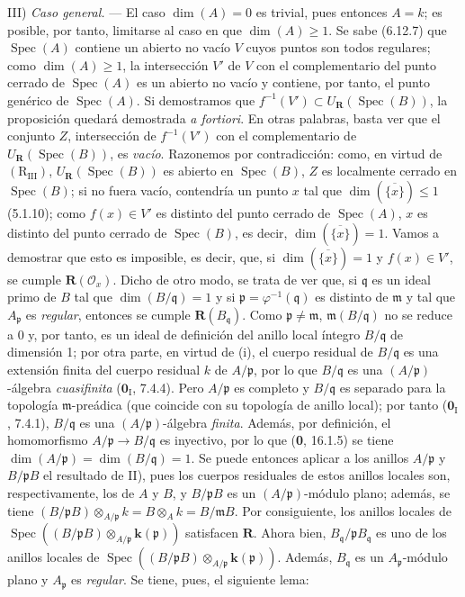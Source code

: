III) \emph{Caso general.} --- El caso $\dim(A)=0$ es trivial, pues entonces
$A=k$; es posible, por tanto, limitarse al caso en que $\dim(A)\geqslant1$.
Se sabe (6.12.7) que $\operatorname{Spec}(A)$ contiene un abierto no vacío
$V$ cuyos puntos son todos regulares; como $\dim(A)\geqslant1$, la
intersección $V'$ de $V$ con el complementario del punto cerrado de
$\operatorname{Spec}(A)$ es un abierto no vacío y contiene, por tanto, el
punto genérico de $\operatorname{Spec}(A)$. Si demostramos que
$f^{-1}(V')\subset U_{\mathbf R}(\operatorname{Spec}(B))$,
la proposición quedará demostrada \emph{a fortiori}. En otras palabras,
basta ver que el conjunto $Z$, intersección de $f^{-1}(V')$ con el
complementario de $U_{\mathbf R}(\operatorname{Spec}(B))$, es \emph{vacío}.
Razonemos por contradicción: como, en virtud de
$(\mathrm R_{\mathrm{III}})$,
$U_{\mathbf R}(\operatorname{Spec}(B))$ es abierto en
$\operatorname{Spec}(B)$, $Z$ es localmente cerrado en
$\operatorname{Spec}(B)$; si no fuera vacío, contendría un punto $x$ tal
que $\dim(\overline{\{x\}})\leqslant1$ (5.1.10); como $f(x)\in V'$
es distinto del punto cerrado de $\operatorname{Spec}(A)$, $x$ es distinto
del punto cerrado de $\operatorname{Spec}(B)$, es decir,
$\dim(\overline{\{x\}})=1$. Vamos a demostrar que esto es imposible,
es decir, que, si $\dim(\overline{\{x\}})=1$ y $f(x)\in V'$, se cumple
$\boldsymbol R(\mathscr O_x)$. Dicho de otro modo, se trata de ver que,
si $\mathfrak q$ es un ideal primo de $B$ tal que
$\dim(B/\mathfrak q)=1$ y si $\mathfrak p=\varphi^{-1}(\mathfrak q)$
es distinto de $\mathfrak m$ y tal que $A_{\mathfrak p}$ es \emph{regular},
entonces se cumple $\boldsymbol R(B_{\mathfrak q})$. Como
$\mathfrak p\ne\mathfrak m$, $\mathfrak m(B/\mathfrak q)$ no se reduce
a 0 y, por tanto, es un ideal de definición del anillo local íntegro
$B/\mathfrak q$ de dimensión 1; por otra parte, en virtud de (i), el
cuerpo residual de $B/\mathfrak q$ es una extensión finita del cuerpo
residual $k$ de $A/\mathfrak p$, por lo que $B/\mathfrak q$ es una
$(A/\mathfrak p)$-álgebra \emph{cuasifinita} ($\mathbf{0}_{\mathrm I}$, 7.4.4). Pero
$A/\mathfrak p$ es completo y $B/\mathfrak q$ es separado para la
topología $\mathfrak m$-preádica (que coincide con su topología de anillo
local); por tanto ($\mathbf{0}_{\mathrm I}$, 7.4.1), $B/\mathfrak q$ es una
$(A/\mathfrak p)$-álgebra \emph{finita}. Además, por definición, el homomorfismo
$A/\mathfrak p\to B/\mathfrak q$ es inyectivo, por lo que (\textbf{0}, 16.1.5)
se tiene
$\dim(A/\mathfrak p)=\dim(B/\mathfrak q)=1$.
Se puede entonces aplicar a los anillos $A/\mathfrak p$ y
$B/\mathfrak pB$ el resultado de II), pues los cuerpos residuales de
estos anillos locales son, respectivamente, los de $A$ y $B$, y
$B/\mathfrak pB$ es un $(A/\mathfrak p)$-módulo plano; además, se tiene
$(B/\mathfrak pB)\otimes_{A/\mathfrak p}k=B\otimes_A k=B/\mathfrak mB$.
Por consiguiente, los anillos locales de
$\operatorname{Spec}((B/\mathfrak pB)
\otimes_{A/\mathfrak p}\boldsymbol{k}(\mathfrak p))$
satisfacen $\boldsymbol R$. Ahora bien,
$B_{\mathfrak q}/\mathfrak pB_{\mathfrak q}$ es uno de los anillos
locales de $\operatorname{Spec}((B/\mathfrak pB)
\otimes_{A/\mathfrak p}\boldsymbol{k}(\mathfrak p))$. Además, $B_{\mathfrak q}$ es
un $A_{\mathfrak p}$-módulo plano y $A_{\mathfrak p}$ es \emph{regular}.
Se tiene, pues, el siguiente lema:
